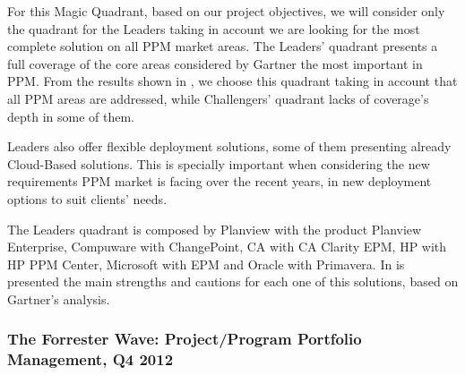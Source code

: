 For this Magic Quadrant, based on our project objectives, we will consider only the quadrant for the Leaders taking in account we are looking for the most complete solution on all PPM market areas. The Leaders' quadrant presents a full coverage of the core areas considered by Gartner the most important in PPM. From the results shown in \cite{magicQuadrantPPM}, we choose this quadrant taking in account that all PPM areas are addressed, while Challengers' quadrant lacks of coverage's depth in some of them.\par
Leaders also offer flexible deployment solutions, some of them presenting already Cloud-Based solutions. This is specially important when considering the new requirements PPM market is facing over the recent years, in new deployment options to suit clients' needs.\par
The Leaders quadrant is composed by Planview with the product Planview Enterprise, Compuware with ChangePoint, CA with CA Clarity EPM, HP with HP PPM Center, Microsoft with EPM and Oracle with Primavera. In \cite{magicQuadrantPPM} is presented the main strengths and cautions for each one of this solutions, based on Gartner's analysis.\par


\subsubsection{The Forrester Wave: Project/Program Portfolio Management, Q4 2012}

